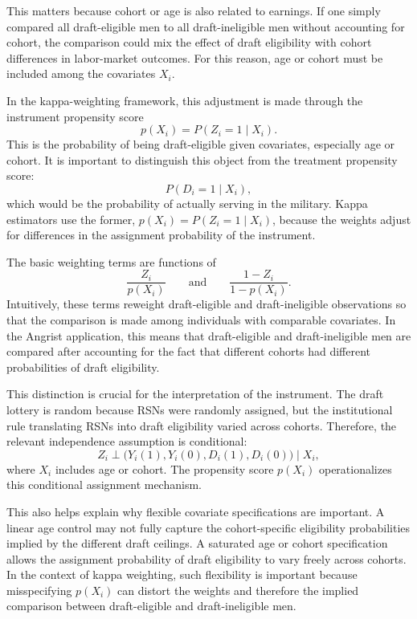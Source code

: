 \documentclass[11pt,a4paper]{article}
\begin{document}
This matters because cohort or age is also related to earnings. If one simply compared all
draft-eligible men to all draft-ineligible men without accounting for cohort, the comparison
could mix the effect of draft eligibility with cohort differences in labor-market outcomes.
For this reason, age or cohort must be included among the covariates \(X_i\).

In the kappa-weighting framework, this adjustment is made through the instrument
propensity score
\[
    p(X_i) = P(Z_i=1\mid X_i).
\]
This is the probability of being draft-eligible given covariates, especially age or cohort.
It is important to distinguish this object from the treatment propensity score:
\[
    P(D_i=1\mid X_i),
\]
which would be the probability of actually serving in the military. Kappa estimators use
the former, \(p(X_i)=P(Z_i=1\mid X_i)\), because the weights adjust for differences in the
assignment probability of the instrument.

The basic weighting terms are functions of
\[
    \frac{Z_i}{p(X_i)}
    \qquad \text{and} \qquad
    \frac{1-Z_i}{1-p(X_i)}.
\]
Intuitively, these terms reweight draft-eligible and draft-ineligible observations so that
the comparison is made among individuals with comparable covariates. In the Angrist
application, this means that draft-eligible and draft-ineligible men are compared after
accounting for the fact that different cohorts had different probabilities of draft
eligibility.

This distinction is crucial for the interpretation of the instrument. The draft lottery is
random because RSNs were randomly assigned, but the institutional rule translating RSNs
into draft eligibility varied across cohorts. Therefore, the relevant independence assumption
is conditional:
\[
    Z_i \perp
    \bigl(Y_i(1),Y_i(0),D_i(1),D_i(0)\bigr)
    \mid X_i,
\]
where \(X_i\) includes age or cohort. The propensity score \(p(X_i)\) operationalizes this
conditional assignment mechanism.

This also helps explain why flexible covariate specifications are important. A linear age
control may not fully capture the cohort-specific eligibility probabilities implied by the
different draft ceilings. A saturated age or cohort specification allows the assignment
probability of draft eligibility to vary freely across cohorts. In the context of kappa
weighting, such flexibility is important because misspecifying \(p(X_i)\) can distort the
weights and therefore the implied comparison between draft-eligible and draft-ineligible
men.
\end{document}
